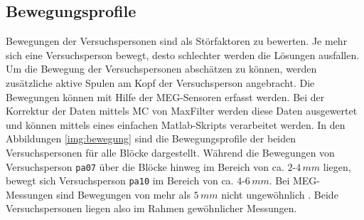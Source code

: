 \documentclass[doc,a4paper,12pt]{apa6}
\begin{document}
\subsection{Bewegungsprofile}
\label{sec:bewegung}

Bewegungen der Versuchspersonen sind als Störfaktoren zu bewerten. Je mehr sich eine Versuchsperson bewegt, desto schlechter werden die Lösungen ausfallen. Um die Bewegung der Versuchspersonen abschätzen zu können, werden zusätzliche aktive Spulen am Kopf der Versuchsperson angebracht. Die Bewegungen können mit Hilfe der MEG-Sensoren erfasst werden. Bei der Korrektur der Daten mittels MC von MaxFilter werden diese Daten ausgewertet und können mittels eines einfachen Matlab-Skripts verarbeitet werden. In den Abbildungen \ref{img:bewegung} sind die Bewegungsprofile der beiden Versuchspersonen für alle Blöcke dargestellt. Während die Bewegungen von Versuchsperson \texttt{pa07} über die Blöcke hinweg im Bereich von ca. $2$-$4\,mm$ liegen, bewegt sich Versuchsperson \texttt{pa10} im Bereich von ca. $4$-$6\,mm$. Bei MEG-Messungen sind Bewegungen von mehr als $5\,mm$ nicht ungewöhnlich \parencite{wilson2007continuous}. Beide Versuchspersonen liegen also im Rahmen gewöhnlicher Messungen.
\end{document}
